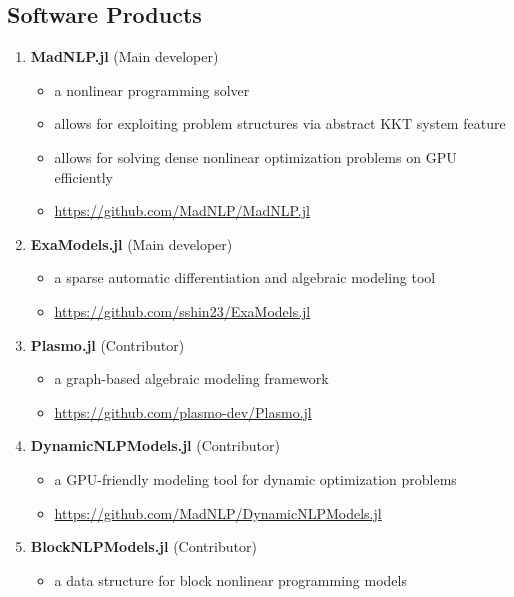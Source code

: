 \documentclass[letterpaper, 11pt]{article}
\begin{document}
\subsection*{Software Products}
\begin{enumerate}[itemsep=0pt]
\renewcommand*{\labelenumi}{[S\theenumi]}
\item {\bf MadNLP.jl} (Main developer)
  \begin{itemize}[leftmargin=*,topsep=0pt,label=$\bullet$,topsep=-5pt,itemsep=-1pt]
  \item a nonlinear programming solver
  \item allows for exploiting problem structures via abstract KKT system feature
  \item allows for solving dense nonlinear optimization problems on GPU efficiently
  \item \url{https://github.com/MadNLP/MadNLP.jl}
\end{itemize}
\item {\bf ExaModels.jl} (Main developer)
  \begin{itemize}[leftmargin=*,topsep=0pt,label=$\bullet$,topsep=-5pt,itemsep=-1pt]
  \item a sparse automatic differentiation and algebraic modeling tool
  \item \url{https://github.com/sshin23/ExaModels.jl}
  \end{itemize}
\item {\bf Plasmo.jl} (Contributor)
  \begin{itemize}[leftmargin=*,topsep=0pt,label=$\bullet$,topsep=-5pt,itemsep=-1pt]
  \item a graph-based algebraic modeling framework
  \item \url{https://github.com/plasmo-dev/Plasmo.jl}
  \end{itemize}
\item {\bf DynamicNLPModels.jl} (Contributor)
  \begin{itemize}[leftmargin=*,topsep=0pt,label=$\bullet$,topsep=-5pt,itemsep=-1pt]
  \item a GPU-friendly modeling tool for dynamic optimization problems
  \item \url{https://github.com/MadNLP/DynamicNLPModels.jl}
  \end{itemize}
\item {\bf BlockNLPModels.jl} (Contributor)
  \begin{itemize}[leftmargin=*,topsep=0pt,label=$\bullet$,topsep=-5pt,itemsep=-1pt]
  \item a data structure for block nonlinear programming models

\end{itemize}
\end{enumerate}
\end{document}
